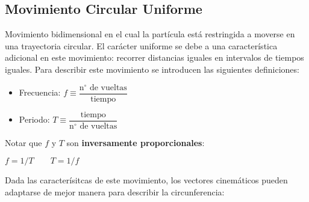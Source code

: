 \documentclass[letterpaper,11pt]{article}
\begin{document}
\subsection*{Movimiento Circular Uniforme}
\label{MCU}
\hspace{-2em}
\begin{minipage}{0.65\linewidth}
    \setlength{\parindent}{15pt}
    Movimiento bidimensional en el cual la partícula está restringida a moverse en una trayectoria circular. El carácter uniforme se debe a una característica adicional en este movimiento: recorrer distancias iguales en intervalos de tiempos iguales.
    \newline Para describir este movimiento se introducen las siguientes definiciones:

    \noindent
    \begin{minipage}{0.5\linewidth}
        \begin{itemize}
            \item Frecuencia: $f \equiv\dfrac{\text{n$^{\circ}$ de vueltas}}{\text{tiempo}}$
    
            \item Periodo: $T \equiv \dfrac{\text{tiempo}}{\text{n$^{\circ}$ de vueltas}}$
        \end{itemize}
    \end{minipage}
    \begin{minipage}{0.5\linewidth}
        \vspace{1em}
        \begin{tcolorbox}[colback=white, colframe=blue, width=1\linewidth]
            Notar que $f$ y $T$ son \textbf{inversamente proporcionales}:
            \begin{center}$f=1/T \qquad T=1/f$\end{center}
        \end{tcolorbox}
    \end{minipage}
\end{minipage}
\hfill
\begin{minipage}{0.3\linewidth}
    \begin{figure}[H]
        \centering
        
    \end{figure}
\end{minipage}

\noindent Dada las caracterísitcas de este movimiento, los vectores cinemáticos pueden adaptarse de mejor manera para describir la circunferencia:
\end{document}
